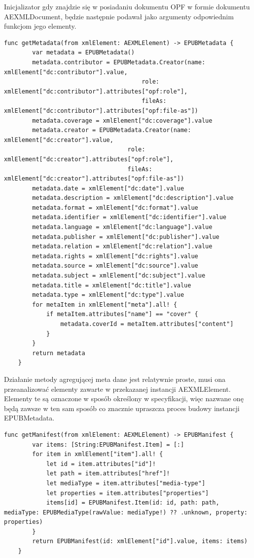 Inicjalizator gdy znajdzie się w posiadaniu dokumentu OPF w formie dokumentu AEXMLDocument, będzie następnie podawał jako argumenty odpowiednim funkcjom jego elementy.

\begin{lstlisting}[caption={Implementacja metody getMetadata(from xmlElement:).},language=swift-reference]
    func getMetadata(from xmlElement: AEXMLElement) -> EPUBMetadata {
        var metadata = EPUBMetadata()
        metadata.contributor = EPUBMetadata.Creator(name: xmlElement["dc:contributor"].value,
                                       role: xmlElement["dc:contributor"].attributes["opf:role"],
                                       fileAs: xmlElement["dc:contributor"].attributes["opf:file-as"])
        metadata.coverage = xmlElement["dc:coverage"].value
        metadata.creator = EPUBMetadata.Creator(name: xmlElement["dc:creator"].value,
                                   role: xmlElement["dc:creator"].attributes["opf:role"],
                                   fileAs: xmlElement["dc:creator"].attributes["opf:file-as"])
        metadata.date = xmlElement["dc:date"].value
        metadata.description = xmlElement["dc:description"].value
        metadata.format = xmlElement["dc:format"].value
        metadata.identifier = xmlElement["dc:identifier"].value
        metadata.language = xmlElement["dc:language"].value
        metadata.publisher = xmlElement["dc:publisher"].value
        metadata.relation = xmlElement["dc:relation"].value
        metadata.rights = xmlElement["dc:rights"].value
        metadata.source = xmlElement["dc:source"].value
        metadata.subject = xmlElement["dc:subject"].value
        metadata.title = xmlElement["dc:title"].value
        metadata.type = xmlElement["dc:type"].value
        for metaItem in xmlElement["meta"].all! {
            if metaItem.attributes["name"] == "cover" {
                metadata.coverId = metaItem.attributes["content"]
            }
        }
        return metadata
    }
\end{lstlisting}

Działanie metody agregującej meta dane jest relatywnie proste, musi ona przeanalizować elementy zawarte w przekazanej instancji AEXMLElement. Elementy te są oznaczone w sposób określony w specyfikacji, więc nazwane onę będą zawsze w ten sam sposób co znacznie upraszcza proces budowy instancji EPUBMetadata.

\begin{lstlisting}[caption={Implementacja metody getManifest(from xmlElement:).},language=swift-reference]
    func getManifest(from xmlElement: AEXMLElement) -> EPUBManifest {
        var items: [String:EPUBManifest.Item] = [:]
        for item in xmlElement["item"].all! {
            let id = item.attributes["id"]!
            let path = item.attributes["href"]!
            let mediaType = item.attributes["media-type"]
            let properties = item.attributes["properties"]
            items[id] = EPUBManifest.Item(id: id, path: path, mediaType: EPUBMediaType(rawValue: mediaType!) ?? .unknown, property: properties)
        }
        return EPUBManifest(id: xmlElement["id"].value, items: items)
    }
\end{lstlisting}

